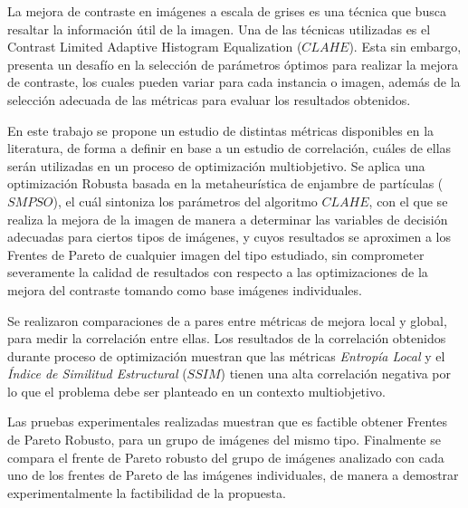 \begin{resumen}
La mejora de contraste en imágenes a escala de grises es una técnica que busca resaltar la información útil de la imagen. Una de las técnicas utilizadas es el Contrast Limited Adaptive Histogram Equalization ($CLAHE$). Esta sin embargo, presenta un desafío en la selección de parámetros óptimos para realizar la mejora de contraste, los cuales pueden variar para cada instancia o imagen, además de la selección adecuada de las métricas para evaluar los resultados obtenidos.

En este trabajo se propone un estudio de distintas métricas disponibles en la literatura, de forma a definir en base a un estudio de correlación, cuáles de ellas serán utilizadas en un proceso de optimización multiobjetivo. Se aplica una  optimización Robusta basada en la metaheurística de enjambre de partículas ($SMPSO$), el cuál sintoniza los parámetros del algoritmo $CLAHE$, con el que se realiza la mejora de la imagen de manera a determinar las variables de decisión adecuadas para ciertos tipos de imágenes, y cuyos resultados se aproximen a los Frentes de Pareto de cualquier imagen del tipo estudiado, sin comprometer severamente la calidad de resultados con respecto a las optimizaciones de la mejora del contraste tomando como base imágenes individuales.

Se realizaron comparaciones de a pares entre métricas de mejora local y global, para medir la correlación entre ellas. Los resultados de la correlación obtenidos durante proceso de optimización muestran que las métricas \textit{Entropía Local} y el \textit{Índice de Similitud Estructural} ($SSIM$) tienen una alta correlación negativa por lo que el problema debe ser planteado en un contexto multiobjetivo.


Las pruebas experimentales realizadas muestran que es factible obtener Frentes de Pareto Robusto, para un grupo de imágenes del mismo tipo. Finalmente se compara el frente de Pareto robusto del grupo de imágenes analizado con cada uno de los frentes de Pareto de las imágenes individuales, de manera a demostrar experimentalmente la factibilidad de la propuesta.
\end{resumen}